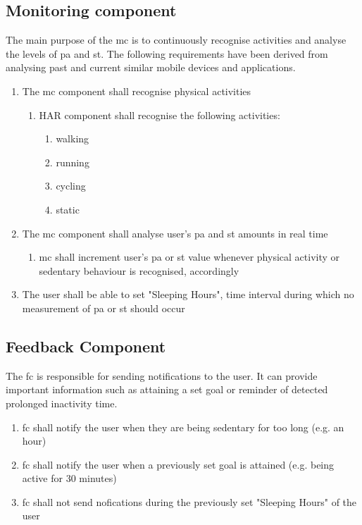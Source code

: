     
    \subsection{Monitoring component}
    The main purpose of the \gls{mc} is to continuously recognise activities and analyse the levels of \gls{pa} and \gls{st}. The following requirements have been derived from analysing past and current similar mobile devices and applications.
    
    \begin{enumerate}
        \item The \gls{mc} component shall recognise physical activities
        \begin{enumerate}
            \item HAR component shall recognise the following activities:
            \begin{enumerate}
                \item walking
                \item running
                \item cycling
                \item static
            \end{enumerate}
        \end{enumerate}
        \item The \gls{mc} component shall analyse user's \gls{pa} and \gls{st} amounts in real time
            \begin{enumerate}
                \item \gls{mc} shall increment user's \gls{pa} or \gls{st} value whenever physical activity or sedentary behaviour is recognised, accordingly
            \end{enumerate}
        \item The user shall be able to set "Sleeping Hours", time interval during which no measurement of \gls{pa} or \gls{st} should occur
      
    \end{enumerate}
    
    \subsection{Feedback Component}
    The \gls{fc} is responsible for sending notifications to the user. It can provide important information such as attaining a set goal or reminder of detected prolonged inactivity time.
    \begin{enumerate}
        \item \gls{fc} shall notify the user when they are being sedentary for too long (e.g. an hour)
        
        \item \gls{fc} shall notify the user when a previously set goal is attained (e.g. being active for 30 minutes)
        
        \item \gls{fc} shall not send nofications during the previously set "Sleeping Hours" of the user
    \end{enumerate}

